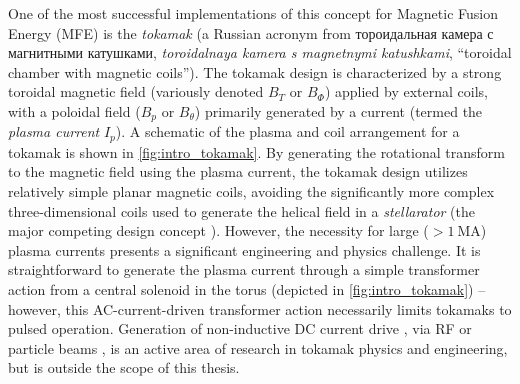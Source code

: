 One of the most successful implementations of this concept for Magnetic Fusion Energy (MFE) is the \emph{tokamak} \cite{Wesson2011} (a Russian acronym from \foreignlanguage{russian}{тороидальная камера с магнитными катушками}, \emph{toroidalnaya kamera s magnetnymi katushkami}, ``toroidal chamber with magnetic coils'').  The tokamak design is characterized by a strong toroidal magnetic field (variously denoted $B_T$ or $B_\Phi$) applied by external coils, with a poloidal field ($B_p$ or $B_\theta$) primarily generated by a current (termed the \emph{plasma current} $I_p$).  A schematic of the plasma and coil arrangement for a tokamak is shown in \cref{fig:intro_tokamak}.  By generating the rotational transform to the magnetic field using the plasma current, the tokamak design utilizes relatively simple planar magnetic coils, avoiding the significantly more complex three-dimensional coils used to generate the helical field in a \emph{stellarator} (the major competing design concept \cite{Meade2010}).  However, the necessity for large ($>\SI{1}{\mega\ampere}$) plasma currents presents a significant engineering and physics challenge.  It is straightforward to generate the plasma current through a simple transformer action from a central solenoid in the torus (depicted in \cref{fig:intro_tokamak}) -- however, this AC-current-driven transformer action necessarily limits tokamaks to pulsed operation.  Generation of non-inductive DC current drive \cite{Westerhof2012}, via RF \cite{Bonoli2014,Prater2004} or particle beams \cite{Gormezano2007}, is an active area of research in tokamak physics and engineering, but is outside the scope of this thesis.

